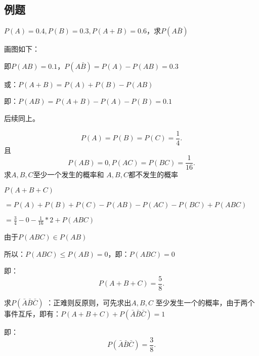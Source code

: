 \subsection{例题}%
\label{sub:例题}
\begin{eg}
    $P\left( A \right) =0.4,P\left( B \right) =0.3,P\left( A+B \right)=0.6 $，求$P\left( A\bar{B} \right) $ 

    画图如下：
    \begin{center}
    \end{center}
    
    即$P\left( AB \right) =0.1$，$P\left( A\bar{B} \right) = P\left( A \right) -P\left( AB \right) =0.3$

    或：$P\left( A+B \right) =P\left( A \right) +P\left( B \right) -P\left( AB \right) $ 

    即：$P\left( AB \right) =P\left( A+B \right) -P\left( A \right) -P\left( B \right) =0.1$ 

    后续同上。
\end{eg}
\begin{eg}
    \[
        P\left( A \right) =P\left( B \right) =P\left( C \right) =\frac{1}{4}
    .\] 且\[
        P\left( AB \right) =0,P\left( AC \right) =P\left( BC \right) =\frac{1}{16}
    .\] 求$A,B,C$至少一个发生的概率和 $A,B,C$都不发生的概率
    
    $P\left( A+B+C \right) $

    $=P\left( A \right) +P\left( B \right) +P\left( C \right) -P\left( AB \right) -P\left( AC \right) -P\left( BC \right) +P\left( ABC \right)$

    $\displaystyle{=\frac{3}{4}-0-\frac{1}{16}*2+P\left( ABC \right) }$
     
    由于$P\left( ABC \right) \in P\left( AB \right) $ 

    所以：$P\left( ABC \right) \le P\left( AB \right) =0$，即：$P\left( ABC \right) =0$ 

    即：\[
        P\left( A+B+C \right) =\frac{5}{8}
    .\] 

    求$P\left( \bar{A}\bar{B}\bar{C} \right) $ ：正难则反原则，可先求出$A,B,C$ 至少发生一个的概率，由于两个事件互斥，即有：$P\left( A+B+C \right) +P\left( \bar{A}\bar{B}\bar{C} \right) =1$

    即：\[
        P\left( \bar{A}\bar{B}\bar{C} \right) =\frac{3}{8}
    .\] 

\end{eg}

